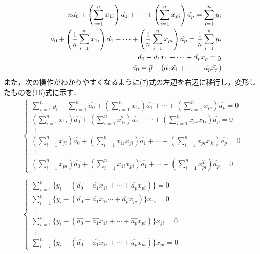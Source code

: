 \documentclass[dvipdfmx]{jsarticle}
\begin{document}
\begin{eqnarray}
  \displaystyle
    &&n\hat{a_0}+\left(\sum_{i=1}^n x_{1i}\right)\hat{a_1}+\cdots+\left(\sum_{i=1}^n x_{pi}\right)\hat{a_p}=\sum_{i=1}^ny_i \nonumber \\
    &&\hat{a_0} + \left(\frac{1}{n}\sum_{i=1}^n x_{1i}\right)\hat{a_1}+\cdots+\left(\frac{1}{n}\sum_{i=1}^n x_{pi}\right)\hat{a_p}=\frac{1}{n}\sum_{i=1}^ny_i \nonumber \\
    && \; \; \; \;\hat{a_0}+\hat{a_1}\bar{x_1}+\cdots+\hat{a_p}\bar{x_p} = \bar{y} \nonumber \\
    && \; \; \; \; \hat{a_0} = \bar{y}-(\hat{a_1}\bar{x_1}+\cdots+\hat{a_p}\bar{x_p})
  \end{eqnarray}
また，次の操作がわかりやすくなるように(7)式の左辺を右辺に移行し，変形したものを(16)式に示す．
\begin{eqnarray}
  \begin{cases}
    \displaystyle
    \sum_{i=1}^n y_i - \sum_{i=1}^n \hat{a_0} + \left(\sum_{i=1}^n x_{1i} \right)\hat{a_1} + \cdots + \left(\sum_{i=1}^n x_{pi} \right)\hat{a_p} = 0    \\
    \displaystyle
    \left(\sum_{i=1}^n x_{1i} \right)\hat{a_0} + \left(\sum_{i=1}^n x_{1i}^2 \right)\hat{a_1} + \cdots + \left(\sum_{i=1}^n x_{pi}x_{1i} \right)\hat{a_p} = 0    \\
    \; \; \vdots                                                                     \\
    \displaystyle
    \left(\sum_{i=1}^n x_{ji} \right)\hat{a_0} + \left(\sum_{i=1}^n x_{1i}x_{ji} \right)\hat{a_1} + \cdots + \left(\sum_{i=1}^n x_{pi}x_{ji} \right)\hat{a_p} = 0 \\
    \; \; \vdots                                                                     \\
    \displaystyle
    \left(\sum_{i=1}^n x_{pi} \right)\hat{a_0} + \left(\sum_{i=1}^n x_{1i}x_{pi} \right)\hat{a_1} + \cdots + \left(\sum_{i=1}^n x_{pi}^2 \right)\hat{a_p} = 0
  \end{cases}
  \nonumber 
  \\
  \nonumber
  \\
  \begin{cases}
    \displaystyle
    \sum_{i=1}^n \{ y_i-(\hat{a_0}+\hat{a_1}x_{1i}+\cdots+\hat{a_p}x_{pi})\}=0       \\
    \displaystyle
    \sum_{i=1}^n \{ y_i-(\hat{a_0}+\hat{a_1}x_{1i}\cdots+\hat{a_p}x_{pi})\}x_{1i}=0  \\
    \; \; \vdots                                                                     \\
    \displaystyle
    \sum_{i=1}^n \{ y_i-(\hat{a_0}+\hat{a_1}x_{1i}+\cdots+\hat{a_p}x_{pi})\}x_{ji}=0 \\
    \; \; \vdots                                                                     \\
    \displaystyle
    \sum_{i=1}^n \{ y_i-(\hat{a_0}+\hat{a_1}x_{1i}+\cdots+\hat{a_p}x_{pi})\}x_{pi}=0
  \end{cases}
\end{eqnarray}
\end{document}
